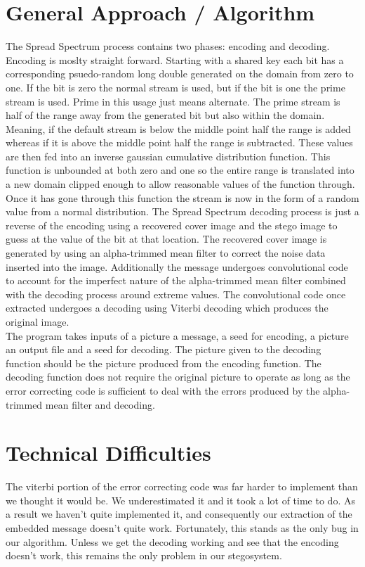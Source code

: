 \documentclass[11pt]{article}
\begin{document}
\section{General Approach / Algorithm}
\indent \indent The Spread Spectrum process contains two phases: encoding and decoding. Encoding is moslty straight forward. Starting with
a shared key each bit has a corresponding psuedo-random long double generated on the domain from zero to one. If the bit is zero the normal
stream is used, but if the bit is one the prime stream is used. Prime in this usage just means alternate. The prime stream is half of the range
away from the generated bit but also within the domain. Meaning, if the default stream is below the middle point half the range is added whereas if
it is above the middle point half the range is subtracted. These values are then fed into an inverse gaussian cumulative distribution function.
This function is unbounded at both zero and one so the entire range is translated into a new domain clipped enough to allow reasonable values of the
function through. Once it has gone through this function the stream is now in the form of a random value from a normal distribution. The Spread Spectrum
decoding process is just a reverse of the encoding using a recovered cover image and the stego image to guess at the value of the bit at that location.
The recovered cover image is generated by using an alpha-trimmed mean filter to correct the noise data inserted into the image. Additionally the message undergoes
convolutional code to account for the imperfect nature of the alpha-trimmed mean filter combined with the decoding process around extreme values. The
convolutional code once extracted undergoes a decoding using Viterbi decoding which produces the original image.  \\

\indent
The program takes inputs of a picture a message, a seed for encoding, a picture an output file and a seed for decoding. The picture given to the
decoding function should be the picture produced from the encoding function. The decoding function does not require the original picture to operate as
long as the error correcting code is sufficient to deal with the errors produced by the alpha-trimmed mean filter and decoding.

\section{Technical Difficulties}
\indent
The viterbi portion of the error correcting code was far harder to implement than we thought it would be. We underestimated it and it took a lot of time to do. As a result we haven't quite implemented it,
and consequently our extraction of the embedded message doesn't quite work. Fortunately, this stands
as the only bug in our algorithm. Unless we get the decoding working and see that the encoding
doesn't work, this remains the only problem in our stegosystem.
\end{document}
